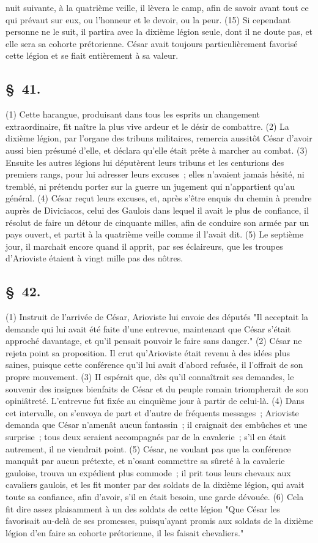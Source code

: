 \documentclass[french,twoside]{book} %
\begin{document}
nuit suivante, à la quatrième veille, il lèvera le camp, afin de savoir avant tout ce qui prévaut sur eux, ou l’honneur et le devoir, ou la peur. (15) Si cependant personne ne le suit, il partira avec la dixième légion seule, dont il ne doute pas, et elle sera sa cohorte prétorienne. César avait toujours particulièrement favorisé cette légion et se fiait entièrement à sa valeur.
\subsection[{§ 41.}]{ \textsc{§ 41.} }
\noindent (1) Cette harangue, produisant dans tous les esprits un changement extraordinaire, fit naître la plus vive ardeur et le désir de combattre. (2) La dixième légion, par l’organe des tribuns militaires, remercia aussitôt César d’avoir aussi bien présumé d’elle, et déclara qu’elle était prête à marcher au combat. (3) Ensuite les autres légions lui députèrent leurs tribuns et les centurions des premiers rangs, pour lui adresser leurs excuses ; elles n’avaient jamais hésité, ni tremblé, ni prétendu porter sur la guerre un jugement qui n’appartient qu’au général. (4) César reçut leurs excuses, et, après s’être enquis du chemin à prendre auprès de Diviciacos, celui des Gaulois dans lequel il avait le plus de confiance, il résolut de faire un détour de cinquante milles, afin de conduire son armée par un pays ouvert, et partit à la quatrième veille comme il l’avait dit. (5) Le septième jour, il marchait encore quand il apprit, par ses éclaireurs, que les troupes d’Arioviste étaient à vingt mille pas des nôtres.
\subsection[{§ 42.}]{ \textsc{§ 42.} }
\noindent (1) Instruit de l’arrivée de César, Arioviste lui envoie des députés "Il acceptait la demande qui lui avait été faite d’une entrevue, maintenant que César s’était approché davantage, et qu’il pensait pouvoir le faire sans danger." (2) César ne rejeta point sa proposition. Il crut qu’Arioviste était revenu à des idées plus saines, puisque cette conférence qu’il lui avait d’abord refusée, il l’offrait de son propre mouvement. (3) II espérait que, dès qu’il connaîtrait ses demandes, le souvenir des insignes bienfaits de César et du peuple romain triompherait de son opiniâtreté. L'entrevue fut fixée au cinquième jour à partir de celui-là. (4) Dans cet intervalle, on s’envoya de part et d’autre de fréquents messages ; Arioviste demanda que César n’amenât aucun fantassin ; il craignait des embûches et une surprise ; tous deux seraient accompagnés par de la cavalerie ; s’il en était autrement, il ne viendrait point. (5) César, ne voulant pas que la conférence manquât par aucun prétexte, et n’osant commettre sa sûreté à la cavalerie gauloise, trouva un expédient plus commode ; il prit tous leurs chevaux aux cavaliers gaulois, et les fit monter par des soldats de la dixième légion, qui avait toute sa confiance, afin d’avoir, s’il en était besoin, une garde dévouée. (6) Cela fit dire assez plaisamment à un des soldats de cette légion "Que César les favorisait au-delà de ses promesses, puisqu’ayant promis aux soldats de la dixième légion d’en faire sa cohorte prétorienne, il les faisait chevaliers."
\end{document}
